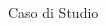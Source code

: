 \begin{frame}{Caso di Studio}
\begin{columns}[onlytextwidth]
\begin{column}{0.45\textwidth}
\begin{figure}[H]
            \end{figure}
        \end{column}
    \end{columns}
\end{frame}